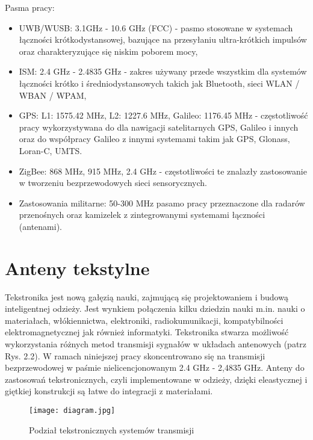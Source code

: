 \noindent Pasma pracy:

\begin{itemize}\setlength{\itemsep}{0pt}
	
	\item UWB/WUSB: 3.1GHz - 10.6 GHz (FCC) - pasmo stosowane w systemach łączności krótkodystansowej, bazujące na przesyłaniu ultra-krótkich impulsów oraz charakteryzujące się niskim poborem mocy,

	\item ISM: 2.4 GHz - 2.4835 GHz - zakres używany przede wszystkim dla systemów łączności krótko i średniodystansowych takich jak Bluetooth, sieci WLAN / WBAN / WPAM,

	\item GPS: L1: 1575.42 MHz, L2: 1227.6 MHz, Galileo: 1176.45 MHz - częstotliwość pracy wykorzystywana do dla nawigacji satelitarnych GPS, Galileo i innych oraz do współpracy Galileo z innymi systemami takim jak GPS, Glonass, Loran-C, UMTS.

	\item ZigBee: 868 MHz, 915 MHz, 2.4 GHz - częstotliwości te znalazły zastosowanie w tworzeniu bezprzewodowych sieci sensorycznych.

	\item Zastosowania militarne: 50-300 MHz pasamo pracy przeznaczone dla radarów przenośnych oraz kamizelek z zintegrowanymi systemami łączności (antenami).

\end{itemize}

\section{Anteny tekstylne}

Tekstronika jest nową gałęzią nauki, zajmującą się projektowaniem i budową inteligentnej odzieży. Jest wynkiem połączenia kilku dziedzin nauki m.in. nauki o materiałach, włókiennictwa, elektroniki, radiokumunikacji, kompatybilności elektromagnetycznej jak również informatyki. Tekstronika stwarza możliwość wykorzystania różnych metod transmisji sygnałów w układach antenowych (patrz Rys. 2.2). W ramach niniejszej pracy skoncentrowano się na transmisji bezprzewodowej w paśmie nielicencjonowanym 2.4 GHz - 2,4835 GHz.  
Anteny do zastosowań tekstronicznych, czyli implementowane w odzieży, dzięki eleastycznej i giętkiej konstrukcji są łatwe do integracji z materiałami.


\begin{figure}[h!]
	\centering
	    \texttt{[image: diagram.jpg]}
	    \caption{Podział tekstronicznych systemów transmisji}
\end{figure}


